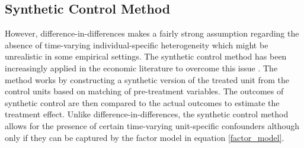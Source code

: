 \subsection{Synthetic Control Method} \label{subsec:sc_methodology}
However, difference-in-differences makes a fairly strong assumption regarding the absence of time-varying individual-specific heterogeneity which might be unrealistic in some empirical settings.
The synthetic control method has been increasingly applied in the economic literature to overcome this issue \citep{abadie_economic_2003, abadie_synthetic_2010, billmeier_assessing_2013, cavallo_catastrophic_2013}. The method works by constructing a synthetic version of the treated unit from the control units  based on matching of pre-treatment variables. The outcomes of synthetic control are then compared to the actual outcomes  to estimate the treatment effect.
Unlike difference-in-differences, the synthetic control method allows for the presence of certain time-varying unit-specific confounders although only if they can be  captured by the factor model in equation \ref{factor_model}.




